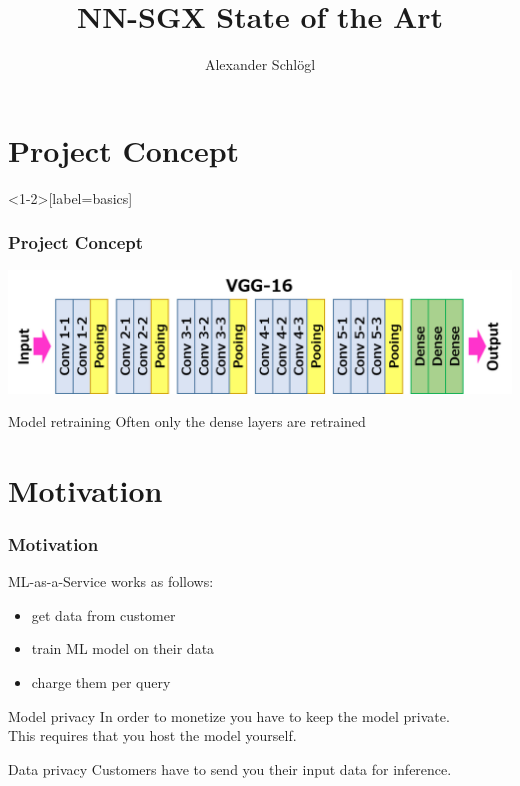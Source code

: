 \documentclass[aspectratio=169,nototalframenumber]{beamer}
\title{NN-SGX State of the Art}
\author{Alexander Schl\"ogl}
\begin{document}
\uibktitlepage{}

\section{Project Concept}
\begin{frame}<1-2>[label=basics]
  \frametitle{Project Concept}
  \begin{center}
    \includegraphics[width=\textwidth]{vgg16.png}
  \end{center}
  
  \pause
  \begin{block}{Model retraining}
    Often only the dense layers are retrained
  \end{block}
  \pause
  
\end{frame}

\section{Motivation}
\begin{frame}
  \frametitle{Motivation}

  ML-as-a-Service works as follows:
  \begin{itemize}
  \item get data from customer
  \item train ML model on their data
  \item charge them per query
  \end{itemize}
  \medskip
  \pause
  \begin{block}{Model privacy}
    In order to monetize you have to keep the model private.\\ 
    This requires that you host the model yourself.
  \end{block}
  \medskip
  \pause
  \begin{block}{Data privacy}
    Customers have to send you their input data for inference.
  \end{block}
\end{frame}
\end{document}
